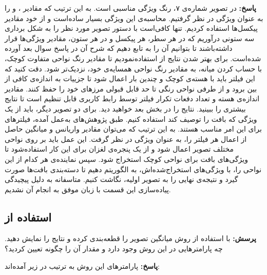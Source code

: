 \documentclass[12pt,a4paper]{article}
\theoremstyle{definition}
\theoremstyle{theorem}
\theoremstyle{definition}
\begin{document}
\textbf{پاسخ:}
در تصویر شماره‌ی ۷، رنگ ویژگی مناسبی است. به این ترتیب که مقادیر ،  و  را به عنوان ویژگی در نظر گرفتیم. محاسبه‌ی این ویژگی بسیار ساده‌است و از خود مقادیر پیکسل‌ها استفاده کردیم. تنها کافی‌است با دستور  تصویر مورد نظر را به شکل برداری سه ستونی درآوریم که در هر سطر، هر پیکسل و در هر ستون، مقادیر ویژگی‌ها قرار داشته‌باشند تا بتوانیم آن را به تابع  دهیم که شرح آن در پاسخ سوال بعد آورده شده‌است. برای بهتر شدن نتایج از  استفاده‌‌نمودیم تا مقادیر رنگ نواحی متفاوت کوچک، با حساب کردن میانه، به مقادیر رنگ نواحی همسایه‌ی خود، نزدیک‌تر شود. دقت کنید که این فیلتر باید با هسته‌ی کوچک و چندین بار اعمال شود تا جزییات به اندازه‌ی کافی از بین برود و از طرفی نواحی رنگی تا حد قابل قبولی مرزهای خود را حفظ کنند. مقادیر اندازه‌ی هسته و تعداد دفعات تکرار فیلتر توسط رابط کاربری قابل تنظیم است تا نتایج بیشتری را ببینید. نتایج را در بخش بعد خواهید دید.
برای دو تصویر دیگر، باید از یک ویژگی که بافت را توصیف کند استفاده کنیم. طبق پژوهش‌های به‌عمل آمده، فیلترهای  برای این امر مناسب هستند. به این ترتیب که می‌توان مقادیر واریانس و میانگین حاصل از اعمال هر فیلتر را، به عنوان ویژگی در نظر گرفت. این عمل باید بر روی نواحی مختلف تصویر اعمال شود و از یک پنجره‌ی لغزان برای این کار استفاده‌شود تا ویژگی‌های بافت برای نواحی کوچک استخراج شود. سپس نماینده‌ی هر کدام از این نواحی را، با ویژگی‌های استخراج‌شده‌اش، به الگوریتم  دهیم تا دسته‌بندی بافت‌ها صورت گیرد و نتیجه‌ی نهایی‌ را به تصویر اولیه، نگاشت کنیم. متاسفانه به دلیل پیچیدگی پیاده‌سازی این قسمت با زبان  موفق به انجام آن نشدیم.
\\

\subsection{استفاده از }
\textbf{پرسش: }
با استفاده از روش  میانگین تصویر را قطعه‌بندی کرده و نتایج را نمایش دهید. چه پارامترهایی در این روش وجود دارد و مقدار آن را چگونه تعیین کردید؟

\textbf{پاسخ: } 
پارامتر‌های این روش به ترتیب در زیر آمده‌اند:
\end{document}
